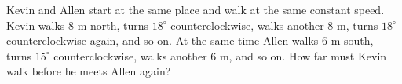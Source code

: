 Kevin and Allen start at the same place and walk at the same constant speed. Kevin walks $8$ m north, turns $18^\circ$ counterclockwise, walks another $8$ m, turns $18^\circ$ counterclockwise again, and so on. At the same time Allen walks $6$ m south, turns $15^\circ$ counterclockwise, walks another $6$ m, and so on. How far must Kevin walk before he meets Allen again?
